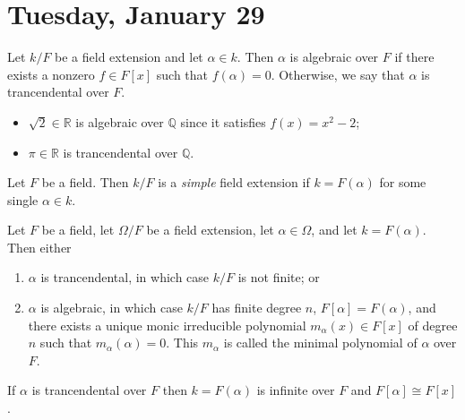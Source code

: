 
\section{Tuesday, January 29}

\begin{definition}[Algebraic]
Let $k/F$ be a field extension and let $\alpha \in k$. Then $\alpha$ is algebraic over $F$ if there exists a nonzero $f \in F[x]$ such that $f(\alpha) = 0$. Otherwise, we say that $\alpha$ is trancendental over $F$.
\begin{itemize}
\item $\sqrt{2} \in \mathbb{R}$ is algebraic over $\mathbb{Q}$ since it satisfies $f(x) = x^2-2$;
\item $\pi \in \mathbb{R}$ is trancendental over $\mathbb{Q}$.
\end{itemize}
\end{definition}

\begin{definition}
Let $F$ be a field. Then $k/F$ is a \emph{simple} field extension if $k = F(\alpha)$ for some single $\alpha \in k$. 
\end{definition}

\begin{theorem}
Let $F$ be a field, let $\Omega/F$ be a field extension, let $\alpha \in \Omega$, and let $k = F(\alpha)$. Then either 
\begin{enumerate}
\item $\alpha$ is trancendental, in which case $k/F$ is not finite; or
\item $\alpha$ is algebraic, in which case $k/F$ has finite degree $n$, $F[\alpha] = F(\alpha)$, and there exists a unique monic irreducible polynomial $m_\alpha(x) \in F[x]$ of degree $n$ such that $m_\alpha(\alpha) = 0$. This $m_\alpha$ is called the minimal polynomial of $\alpha$ over $F$.
\end{enumerate}
\end{theorem}

\begin{lemma}
If $\alpha$ is trancendental over $F$ then $k = F(\alpha)$ is infinite over $F$ and $F[\alpha] \cong F[x]$.
\end{lemma}

